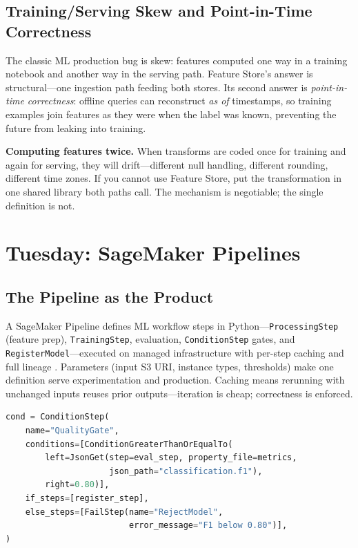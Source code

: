\subsection{Training/Serving Skew and Point-in-Time Correctness}
The classic ML production bug is skew: features computed one way in a training notebook and another way in the serving path. Feature Store's answer is structural---one ingestion path feeding both stores. Its second answer is \emph{point-in-time correctness}: offline queries can reconstruct \emph{as of} timestamps, so training examples join features as they were when the label was known, preventing the future from leaking into training.

\begin{pitfall}
\textbf{Computing features twice.} When transforms are coded once for training and again for serving, they will drift---different null handling, different rounding, different time zones. If you cannot use Feature Store, put the transformation in one shared library both paths call. The mechanism is negotiable; the single definition is not.
\end{pitfall}

\section{Tuesday: SageMaker Pipelines}
\subsection{The Pipeline as the Product}
A SageMaker Pipeline defines ML workflow steps in Python---\texttt{ProcessingStep} (feature prep), \texttt{TrainingStep}, evaluation, \texttt{ConditionStep} gates, and \texttt{RegisterModel}---executed on managed infrastructure with per-step caching and full lineage \cite{awsSageMakerPipelinesDocs}. Parameters (input S3 URI, instance types, thresholds) make one definition serve experimentation and production. Caching means rerunning with unchanged inputs reuses prior outputs---iteration is cheap; correctness is enforced.

\begin{lstlisting}[language=Python,caption={The quality gate: register only when F1 clears the bar.},label={lst:ch19-pipeline-gate}]
cond = ConditionStep(
    name="QualityGate",
    conditions=[ConditionGreaterThanOrEqualTo(
        left=JsonGet(step=eval_step, property_file=metrics,
                     json_path="classification.f1"),
        right=0.80)],
    if_steps=[register_step],
    else_steps=[FailStep(name="RejectModel",
                         error_message="F1 below 0.80")],
)
\end{lstlisting}

